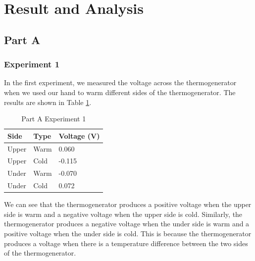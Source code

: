 \documentclass[a4paper, 12pt, english]{article}
\begin{document}
\section{Result and Analysis}
\subsection{Part A}
\subsubsection{Experiment 1}
In the first experiment, we measured the voltage across the thermogenerator
when we used our hand to warm different sides of the thermogenerator. The
results are shown in Table \ref{tab:partA1}.
\begin{table}[H]
	\centering
	\caption{Part A Experiment 1}
	\label{tab:partA1}
	\begin{tabular}{@{}lll@{}}
		\toprule
		\textbf{Side} & \textbf{Type} & \textbf{Voltage (V)} \\ \midrule
		Upper         & Warm          & 0.060                \\
		Upper         & Cold          & -0.115               \\
		Under         & Warm          & -0.070                \\
		Under         & Cold          & 0.072                \\ \bottomrule
	\end{tabular}
\end{table}

We can see that the thermogenerator produces a positive voltage when the upper
side is warm and a negative voltage when the upper side is cold. Similarly, the
thermogenerator produces a negative voltage when the under side is warm and a
positive voltage when the under side is cold. This is because the
thermogenerator produces a voltage when there is a temperature difference
between the two sides of the thermogenerator.
\end{document}
